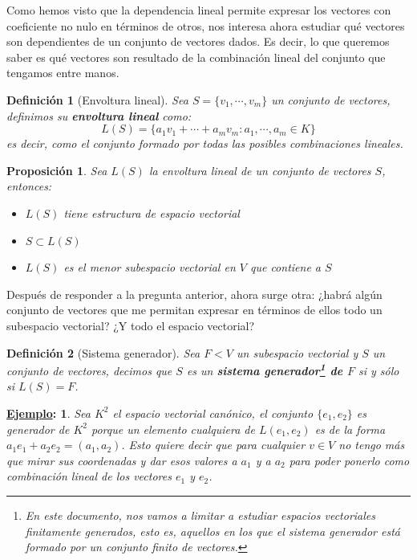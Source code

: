 \documentclass[10pt,a4paper,openright]{book}
\theoremstyle{break}
\newtheorem*{defi}{Definición}
\newtheorem*{prop}{Proposición}
\newtheorem*{ej}{\underline{Ejemplo}:}
\begin{document}
Como hemos visto que la dependencia lineal permite expresar los vectores con coeficiente no nulo en términos de otros, nos interesa ahora estudiar qué vectores son dependientes de un conjunto de vectores dados. Es decir, lo que queremos saber es qué vectores son resultado de la combinación lineal del conjunto que tengamos entre manos.

\begin{defi}[Envoltura lineal]
Sea $S = \{v_1, \cdots, v_m\}$ un conjunto de vectores, definimos su \textbf{envoltura lineal} como:
$$
L(S)=\{a_1v_1+\cdots + a_mv_m: a_1, \cdots, a_m\in K\}
$$
es decir, como el conjunto formado por todas las posibles combinaciones lineales.
\end{defi}
\newpage

\begin{prop}
Sea $L(S)$ la envoltura lineal de un conjunto de vectores $S$, entonces:
\begin{itemize}
\item $L(S)$ tiene estructura de espacio vectorial
\item $S\subset L(S)$
\item $L(S)$ es el menor subespacio vectorial en $V$ que contiene a $S$
\end{itemize}
\end{prop}

Después de responder a la pregunta anterior, ahora surge otra: ¿habrá algún conjunto de vectores que me permitan expresar en términos de ellos todo un subespacio vectorial? ¿Y todo el espacio vectorial?

\begin{defi}[Sistema generador]
Sea $F<V$ un subespacio vectorial y $S$ un conjunto de vectores, decimos que $S$ es un \textbf{sistema generador\footnote{En este documento, nos vamos a limitar a estudiar espacios vectoriales finitamente generados, esto es, aquellos en los que el sistema generador está formado por un conjunto finito de vectores.} de $F$} si y sólo si $L(S)=F$.
\end{defi}

\begin{ej}
Sea $K^2$ el espacio vectorial canónico, el conjunto $\{e_1, e_2\}$ es generador de $K^2$ porque un elemento cualquiera de $L(e_1,e_2)$ es de la forma $a_1e_1+a_2e_2=(a_1, a_2)$. Esto quiere decir que para cualquier $v\in V$ no tengo más que mirar sus coordenadas y dar esos valores a $a_1$ y a $a_2$ para poder ponerlo como combinación lineal de los vectores $e_1$ y $e_2$.
\end{ej}
\end{document}

